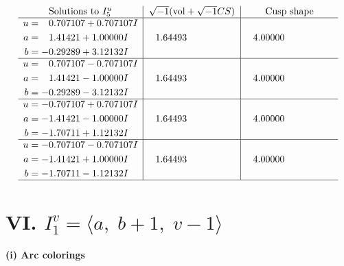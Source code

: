 \documentclass[1p]{elsarticle_modified}
\theoremstyle{definition}
\newcommand{\I}{\sqrt{-1}}
\begin{document}
$$\begin{array}{c|c|c}  
\text{Solutions to }I^u_{5}& \I (\text{vol} + \sqrt{-1}CS) & \text{Cusp shape}\\
 \hline 
\begin{aligned}
u &= \phantom{-}0.707107 + 0.707107 I \\
a &= \phantom{-}1.41421 + 1.00000 I \\
b &= -0.29289 + 3.12132 I\end{aligned}
 & \phantom{-}1.64493\phantom{ +0.000000I} & \phantom{-}4.00000\phantom{ +0.000000I} \\ \hline\begin{aligned}
u &= \phantom{-}0.707107 - 0.707107 I \\
a &= \phantom{-}1.41421 - 1.00000 I \\
b &= -0.29289 - 3.12132 I\end{aligned}
 & \phantom{-}1.64493\phantom{ +0.000000I} & \phantom{-}4.00000\phantom{ +0.000000I} \\ \hline\begin{aligned}
u &= -0.707107 + 0.707107 I \\
a &= -1.41421 - 1.00000 I \\
b &= -1.70711 + 1.12132 I\end{aligned}
 & \phantom{-}1.64493\phantom{ +0.000000I} & \phantom{-}4.00000\phantom{ +0.000000I} \\ \hline\begin{aligned}
u &= -0.707107 - 0.707107 I \\
a &= -1.41421 + 1.00000 I \\
b &= -1.70711 - 1.12132 I\end{aligned}
 & \phantom{-}1.64493\phantom{ +0.000000I} & \phantom{-}4.00000\phantom{ +0.000000I}\\
 \hline 
 \end{array}$$\newpage\newpage\renewcommand{\arraystretch}{1}
\centering \section*{VI. $I^v_{1}= \langle a,\;b+1,\;v-1 \rangle$}
\flushleft \textbf{(i) Arc colorings}\\
\end{document}
